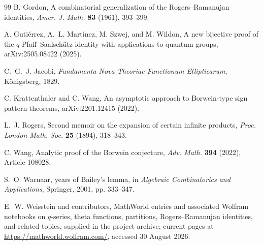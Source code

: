 \documentclass[11pt]{article}
\theoremstyle{blueplain}
\theoremstyle{bluedef}
\begin{document}
\begin{thebibliography}{99}
B. Gordon,
\newblock A combinatorial generalization of the Rogers--Ramanujan identities,
\newblock \emph{Amer. J. Math.} \textbf{83} (1961), 393--399.

A. Guti\'errez, A.~L. Mart\'inez, M. Szwej, and M. Wildon,
\newblock A new bijective proof of the $q$-Pfaff--Saalsch\"utz identity with applications to quantum groups,
\newblock arXiv:2505.08422 (2025).

C.~G.~J. Jacobi,
\newblock \emph{Fundamenta Nova Theoriae Functionum Ellipticarum},
\newblock K\"onigsberg, 1829.

C. Krattenthaler and C. Wang,
\newblock An asymptotic approach to Borwein-type sign pattern theorems,
\newblock arXiv:2201.12415 (2022).

L.~J. Rogers,
\newblock Second memoir on the expansion of certain infinite products,
\newblock \emph{Proc. London Math. Soc.} \textbf{25} (1894), 318--343.

C. Wang,
\newblock Analytic proof of the Borwein conjecture,
\newblock \emph{Adv. Math.} \textbf{394} (2022), Article 108028.

S.~O. Warnaar,
 years of Bailey's lemma,
\newblock in \emph{Algebraic Combinatorics and Applications}, Springer, 2001, pp. 333--347.

E.~W. Weisstein and contributors,
\newblock MathWorld entries and associated Wolfram notebooks on $q$-series, theta functions, partitions, Rogers--Ramanujan identities, and related topics,
\newblock supplied in the project archive; current pages at \url{https://mathworld.wolfram.com/}, accessed 30 August 2026.

\end{thebibliography}
\end{document}
